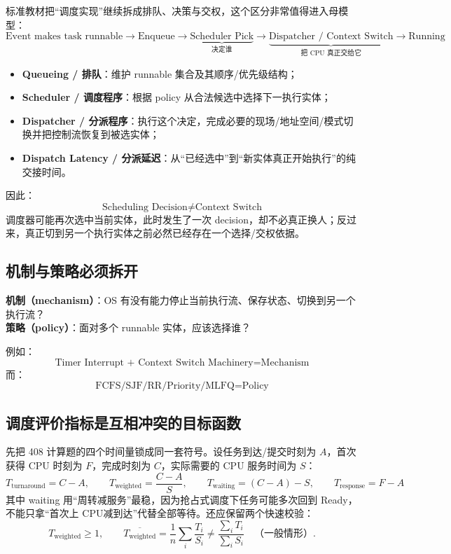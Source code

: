 \documentclass[11pt,a4paper]{ctexart}
\newcommand{\kw}[1]{\textbf{#1}}
\begin{document}
标准教材把“调度实现”继续拆成排队、决策与交权，这个区分非常值得进入母模型：
\[
\boxed{
\text{Event makes task runnable}
\rightarrow
\text{Enqueue}
\rightarrow
\underbrace{\text{Scheduler Pick}}_{\text{决定谁}}
\rightarrow
\underbrace{\text{Dispatcher / Context Switch}}_{\text{把 CPU 真正交给它}}
\rightarrow
\text{Running}
}
\]
\begin{itemize}
\item \kw{Queueing / 排队}：维护 runnable 集合及其顺序/优先级结构；
\item \kw{Scheduler / 调度程序}：根据 policy 从合法候选中选择下一执行实体；
\item \kw{Dispatcher / 分派程序}：执行这个决定，完成必要的现场/地址空间/模式切换并把控制流恢复到被选实体；
\item \kw{Dispatch Latency / 分派延迟}：从“已经选中”到“新实体真正开始执行”的纯交接时间。
\end{itemize}

因此：
\[
\boxed{\text{Scheduling Decision}\neq\text{Context Switch}}
\]
调度器可能再次选中当前实体，此时发生了一次 decision，却不必真正换人；反过来，真正切到另一个执行实体之前必然已经存在一个选择/交权依据。

\subsection{机制与策略必须拆开}

\begin{corebox}[机制 / 策略]
\textbf{机制（mechanism）}：OS 有没有能力停止当前执行流、保存状态、切换到另一个执行流？\\
\textbf{策略（policy）}：面对多个 runnable 实体，应该选择谁？
\end{corebox}

例如：
\[
\text{Timer Interrupt + Context Switch Machinery}=\text{Mechanism}
\]
而：
\[
\text{FCFS/SJF/RR/Priority/MLFQ}=\text{Policy}
\]

\subsection{调度评价指标是互相冲突的目标函数}

先把 408 计算题的四个时间量锁成同一套符号。设任务到达/提交时刻为 $A$，首次获得 CPU 时刻为 $F$，完成时刻为 $C$，实际需要的 CPU 服务时间为 $S$：
\[
\boxed{
T_{\text{turnaround}}=C-A,
\qquad
T_{\text{weighted}}=\frac{C-A}{S},
\qquad
T_{\text{waiting}}=(C-A)-S,
\qquad
T_{\text{response}}=F-A
}
\]
其中 waiting 用“周转减服务”最稳，因为抢占式调度下任务可能多次回到 Ready，不能只拿“首次上 CPU减到达”代替全部等待。还应保留两个快速校验：
\[
T_{\text{weighted}}\ge 1,
\qquad
\overline{T_{\text{weighted}}}=\frac{1}{n}\sum_i\frac{T_i}{S_i}
\neq
\frac{\sum_i T_i}{\sum_i S_i}\quad\text{（一般情形）}.
\]
\end{document}
